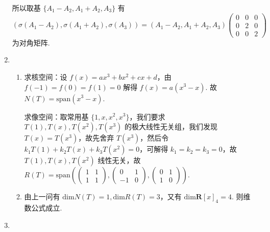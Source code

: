 \begin{enumerate}
    所以取基 $\{A_1-A_2,A_1+A_2,A_3\}$ 有
    \[(\sigma(A_1-A_2),\sigma(A_1+A_2),\sigma(A_3))=(A_1-A_2,A_1+A_2,A_3)\begin{pmatrix}0 & 0 & 0 \\ 0 & 2 & 0 \\ 0 & 0 & 2\end{pmatrix}\]
    为对角矩阵.
    \item \begin{enumerate}
        \item 求核空间：设 $f(x)=ax^3+bx^2+cx+d$，由 $f(-1)=f(0)=f(1)=0$ 解得 $f(x)=a(x^3-x)$. 故 $N(T)=\mathrm{span}(x^3-x)$.
        
        求像空间：取常用基 $\{1,x,x^2,x^3\}$，我们要求 $T(1),T(x),T(x^2),T(x^3)$ 的极大线性无关组，我们发现 $T(x)=T(x^3)$，故先舍弃 $T(x^3)$，然后令 $k_1T(1)+k_2T(x)+k_3T(x^2)=0$，可解得 $k_1=k_2=k_3=0$，故 $T(1),T(x),T(x^2)$ 线性无关，故 $R(T)=\mathrm{span}(\begin{pmatrix}1 & 1 \\ 1 & 1\end{pmatrix},\begin{pmatrix}0 & 1 \\ -1 & 0\end{pmatrix},\begin{pmatrix}0 & 1 \\ 1 & 0\end{pmatrix})$.
        \item 由上一问有 $\mathrm{dim}N(T)=1,\mathrm{dim}R(T)=3$，又有 $\mathrm{dim}\mathbf{R}[x]_4=4$. 则维数公式成立.
    \end{enumerate}
    \item
\end{enumerate}
